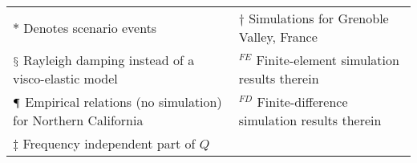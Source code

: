 \begin{table}[]
{\begin{tabular}{lccccccc}
			\multicolumn{4}{l}{$*$ Denotes scenario events}                                                                                & \multicolumn{4}{l}{$\dagger$ Simulations for Grenoble Valley, France}                                                                                                                                                                                                                   \\
			\multicolumn{4}{l}{$\mathsection$ Rayleigh damping instead of a visco-elastic model}                     & \multicolumn{4}{l}{$^{FE}$ Finite-element simulation results therein}                                                                                                                                                                                                                 \\
			\multicolumn{4}{l}{$\mathparagraph$ Empirical relations (no simulation) for Northern California}     & \multicolumn{4}{l}{$^{FD}$ Finite-difference simulation results therein}            \\
			\multicolumn{4}{l}{$\ddagger$ Frequency independent part of $Q$}                                                  & \multicolumn{4}{l}{}                                                                                                                                                                                                     
		\end{tabular}}
\end{table}